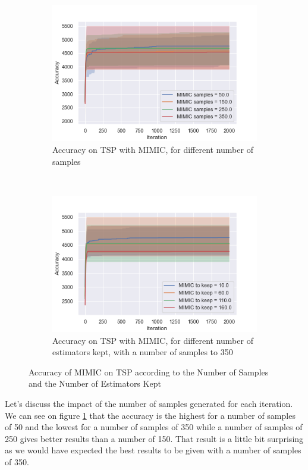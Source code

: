 \documentclass[twocolumn, 10pt]{article}
\begin{document}
				\begin{figure}[h]
					\centering
					\begin{subfigure}[t]{\columnwidth}
						\centering
						\includegraphics[width=0.68\linewidth]{../graphics/tsp_MIMIC_Iteration_Error_MIMIC_samples.png}
						\caption{Accuracy on TSP with MIMIC, for different number of samples}
						\label{tsp:mimic_samples}
					\end{subfigure}
					~
					\begin{subfigure}[t]{\columnwidth}
						\centering
						\includegraphics[width=0.68\linewidth]{../graphics/tsp_MIMIC_Iteration_Error_MIMIC_to_keep.png}
						\caption{Accuracy on TSP with MIMIC, for different number of estimators kept, with a number of samples to 350}
						\label{tsp:mimic_to_keep}
					\end{subfigure}
					\caption{Accuracy of MIMIC on TSP according to the Number of Samples and the Number of Estimators Kept}
					\label{tsp:mimic}
				\end{figure}

				Let's discuss the impact of the number of samples generated for each iteration. We can see on figure \ref{tsp:mimic_samples} that the accuracy is the highest for a number of samples of 50 and the lowest for a number of samples of 350 while a number of samples of 250 gives better results than a number of 150. That result is a little bit surprising as we would have expected the best results to be given with a number of samples of 350.
\end{document}
